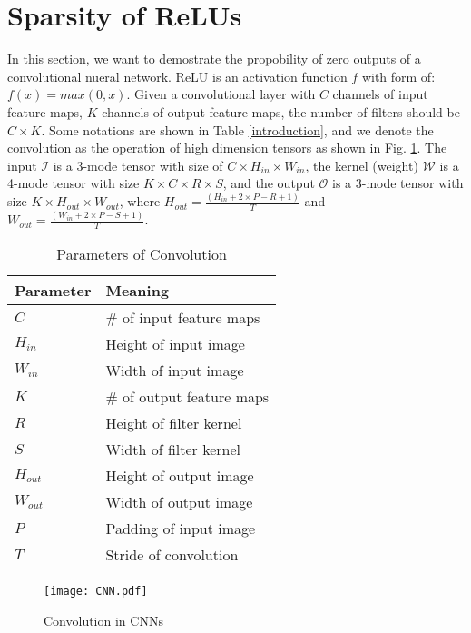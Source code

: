 \documentclass{article}
\begin{document}
\section{Sparsity of ReLUs}
\label{s:analysis}
In this section, we want to demostrate the propobility of zero outputs of a convolutional nueral network. ReLU is an activation function $f$ with form of: $f(x)=max(0, x)$. Given a convolutional layer with $C$ channels of input feature maps, $K$ channels of output feature maps, the number of filters should be $C\times K$. Some notations are shown in Table \ref{introduction}, and we denote the convolution as the operation of high dimension tensors as shown in Fig. \ref{fig:convolution}. The input $\mathcal{I}$ is a 3-mode tensor with size of $C\times H_{in} \times W_{in}$, the kernel (weight) $\mathcal{W}$ is a 4-mode tensor with size $K\times C\times R\times S$, and the output $\mathcal{O}$ is a 3-mode tensor with size $K\times H_{out}\times W_{out}$, where $H_{out}=\frac{(H_{in}+2\times P-R+1)}{T}$ and $W_{out}=\frac{(W_{in}+2\times P-S+1)}{T}$.

\begin{table}[!ht]
\centering
\caption{Parameters of Convolution}
\label{table:parameters}
\begin{tabular}{|l|l|}
\hline
Parameter  &  Meaning \\\cline{1-2}
\hline
\hline
$C$ & \# of input feature maps \\\cline{1-2}
$H_{in}$ & Height of input image \\\cline{1-2}
$W_{in}$ & Width of input image \\\cline{1-2}
$K$ & \# of output feature maps \\\cline{1-2}
$R$ & Height of filter kernel \\\cline{1-2}
$S$ & Width of filter kernel \\\cline{1-2}
$H_{out}$ & Height of output image \\\cline{1-2}
$W_{out}$ & Width of output image \\\cline{1-2}
$P$ & Padding of input image \\\cline{1-2}
$T$ & Stride of convolution \\\cline{1-2}
\end{tabular}
\end{table}

\begin{figure}[!ht]
  \centering
    \texttt{[image: CNN.pdf]}
\caption{Convolution in CNNs}
\label{fig:convolution}
\end{figure}
\end{document}
